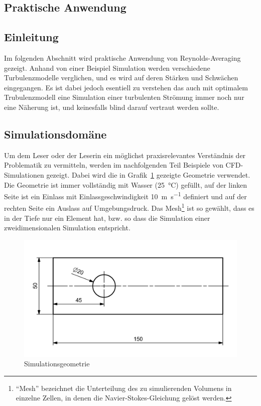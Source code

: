 \begin{refsection}



\section{Praktische Anwendung}

\subsection{Einleitung}

Im folgenden Abschnitt wird praktische Anwendung von Reynolds-Averaging gezeigt.
Anhand von einer Beispiel Simulation werden verschiedene Turbulenzmodelle verglichen, und es wird auf deren Stärken und Schwächen eingegangen.
Es ist dabei jedoch esentiell zu verstehen das auch mit optimalem Trubulenzmodell eine Simulation einer turbulenten Strömung immer noch nur eine Näherung ist,
und keinesfalls blind darauf vertraut werden sollte.

\subsection{Simulationsdomäne}
\label{subsubsec:domain-desc}

Um dem Leser oder der Leserin ein möglichst praxisrelevantes Verständnis der Problematik zu vermitteln, werden
im nachfolgenden Teil Beispiele von CFD-Simulationen gezeigt.
Dabei wird die in Grafik~\ref{fig:SimDomain} gezeigte Geometrie verwendet.
Die Geometrie ist immer vollständig mit Wasser (\SI{25}{\degreeCelsius}) gefüllt,
auf der linken Seite ist ein Einlass mit Einlassgeschwindigkeit \SI{10}{\meter\per\second} definiert und
auf der rechten Seite ein Auslass auf Umgebungsdruck.
Das Mesh\footnote{``Mesh'' bezeichnet die Unterteilung des zu simulierenden Volumens in einzelne Zellen,
in denen die Navier-Stokes-Gleichung gelöst werden.} ist so gewählt, dass es in der Tiefe nur ein Element hat,
bzw. so dass die Simulation einer zweidimensionalen Simulation entspricht.

\begin{figure}
    \includegraphics[width=\textwidth]{papers/reynolds/images/domain.png}
    \caption{Simulationsgeometrie}
    \label{fig:SimDomain}
\end{figure}


\end{refsection}
